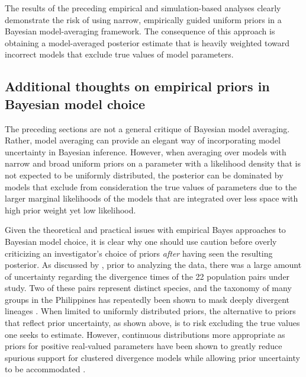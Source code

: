 The results of the preceding empirical and simulation-based analyses clearly
demonstrate the risk of using narrow, empirically guided uniform priors in a
Bayesian model-averaging framework.
The consequence of this approach is obtaining a model-averaged posterior
estimate that is heavily weighted toward incorrect models that exclude true
values of model parameters.


\subsection{Additional thoughts on empirical priors in Bayesian model choice}
The preceding sections are not a general critique of Bayesian model averaging.
Rather, model averaging can provide an elegant way of incorporating
model uncertainty in Bayesian inference.
However, when averaging over models with narrow and broad uniform priors on a
parameter with a likelihood density that is not expected to be uniformly
distributed, the posterior can be dominated by models that exclude from
consideration the true values of parameters due to the larger marginal
likelihoods of the models that are integrated over less space with high prior
weight yet low likelihood.

Given the theoretical and practical issues with empirical Bayes approaches to
Bayesian model choice, it is clear why one should use caution before overly
criticizing an investigator's choice of priors \emph{after} having seen the
resulting posterior.
As discussed by \citet{Oaks2012}, prior to analyzing the data, there was a
large amount of uncertainty regarding the divergence times of the 22 population
pairs under study.
Two of these pairs represent distinct species, and the taxonomy of many groups
in the Philippines has repeatedly been shown to mask deeply divergent lineages
\citep{RafeDiesmosAlcala2008,Linkem2010,Siler2010,Welton2010,Siler2011HerpMonographs,
Siler2011,Siler2012,RafeStuart2012,LinkemBrown2013,Rafe2013AREES,Siler2014kikuchii}.
When limited to uniformly distributed priors, the alternative to priors that
reflect prior uncertainty, as shown above, is to risk excluding the true values
one seeks to estimate.
However, continuous distributions more appropriate as priors for positive
real-valued parameters have been shown to greatly reduce spurious support for
clustered divergence models while allowing prior uncertainty to be accommodated
\citep{Oaks2014dpp}.




